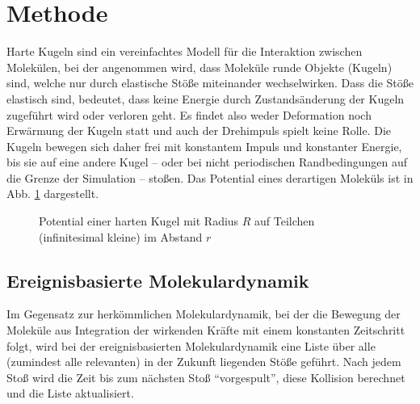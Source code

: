 \section{Methode }
Harte Kugeln sind ein vereinfachtes Modell für die Interaktion zwischen Molekülen, bei der angenommen wird, dass Moleküle runde Objekte (Kugeln) sind, welche nur durch elastische Stöße miteinander wechselwirken.
Dass die Stöße elastisch sind, bedeutet, dass keine Energie durch Zustandsänderung der Kugeln zugeführt wird oder verloren geht. Es findet also weder Deformation noch Erwärmung der Kugeln statt und auch der Drehimpuls spielt keine Rolle. Die Kugeln bewegen sich daher frei mit konstantem Impuls und konstanter Energie, bis sie auf eine andere Kugel -- oder bei nicht periodischen Randbedingungen auf die Grenze der Simulation -- stoßen. Das Potential eines derartigen Moleküls ist in Abb. \ref{fig:hkpotential} dargestellt.
\begin{figure}[H] \centering
{}
\caption{Potential einer harten Kugel mit Radius $R$ auf Teilchen (infinitesimal kleine) im Abstand $r$}
 \label{fig:hkpotential}
\end{figure} 

\subsection{Ereignisbasierte Molekulardynamik}

Im Gegensatz zur herkömmlichen Molekulardynamik, bei der die Bewegung der Moleküle aus Integration der wirkenden Kräfte mit einem konstanten Zeitschritt folgt, wird bei der ereignisbasierten Molekulardynamik eine Liste über alle (zumindest alle relevanten) in der Zukunft liegenden Stöße geführt. Nach jedem Stoß wird die Zeit bis zum nächsten Stoß ``vorgespult'', diese Kollision berechnet und die Liste aktualisiert.

